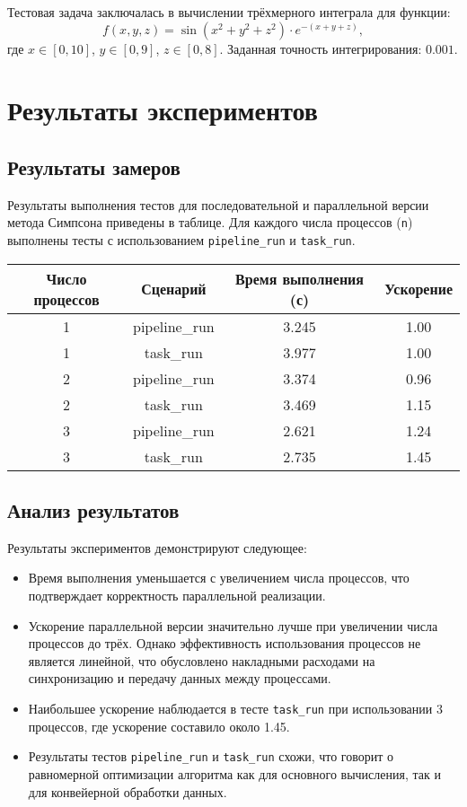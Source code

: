 \documentclass[12pt]{article}
\begin{document}
Тестовая задача заключалась в вычислении трёхмерного интеграла для функции:
\[
    f(x, y, z) = \sin(x^2 + y^2 + z^2) \cdot e^{-(x + y + z)},
\]
где $x \in [0, 10]$, $y \in [0, 9]$, $z \in [0, 8]$. Заданная точность интегрирования: $0.001$.

\section*{Результаты экспериментов}

\subsection*{Результаты замеров}
Результаты выполнения тестов для последовательной и параллельной версии метода Симпсона приведены в таблице. Для каждого числа процессов (\texttt{n}) выполнены тесты с использованием \texttt{pipeline\_run} и \texttt{task\_run}.

\begin{tabular}{|c|c|c|c|}
    \hline
    Число процессов & Сценарий      & Время выполнения (с) & Ускорение \\ \hline
    1               & pipeline\_run & 3.245                & 1.00      \\ \hline
    1               & task\_run     & 3.977                & 1.00      \\ \hline
    2               & pipeline\_run & 3.374                & 0.96      \\ \hline
    2               & task\_run     & 3.469                & 1.15      \\ \hline
    3               & pipeline\_run & 2.621                & 1.24      \\ \hline
    3               & task\_run     & 2.735                & 1.45      \\ \hline
\end{tabular}

\subsection*{Анализ результатов}
Результаты экспериментов демонстрируют следующее:
\begin{itemize}
    \item Время выполнения уменьшается с увеличением числа процессов, что подтверждает корректность параллельной реализации.
    \item Ускорение параллельной версии значительно лучше при увеличении числа процессов до трёх. Однако эффективность использования процессов не является линейной, что обусловлено накладными расходами на синхронизацию и передачу данных между процессами.
    \item Наибольшее ускорение наблюдается в тесте \texttt{task\_run} при использовании 3 процессов, где ускорение составило около 1.45.
    \item Результаты тестов \texttt{pipeline\_run} и \texttt{task\_run} схожи, что говорит о равномерной оптимизации алгоритма как для основного вычисления, так и для конвейерной обработки данных.
\end{itemize}
\end{document}
